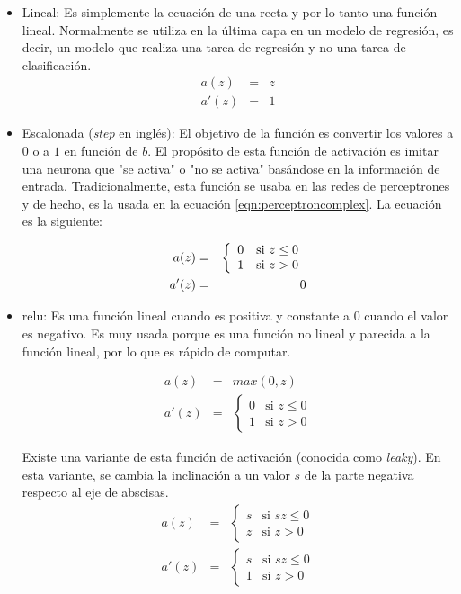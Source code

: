 \begin{itemize}
\item Lineal: Es simplemente la ecuación de una recta y por lo tanto una función lineal. Normalmente se utiliza en la última capa en un modelo de regresión, es decir, un modelo que realiza una tarea de regresión y no una tarea de clasificación.
\begin{eqnarray}
  a(z) & = & z \\
  a'(z) & = & 1 
\end{eqnarray}

\item Escalonada (\textit{step} en inglés): El objetivo de la función es convertir los valores a $0$ o a $1$ en función de $b$. El propósito de esta función de activación es imitar una neurona que "se activa" o "no se activa" basándose en la información de entrada. Tradicionalmente, esta función se usaba en las redes de perceptrones y de hecho, es la usada en la ecuación \ref{eqn:perceptroncomplex}. La ecuación es la siguiente:

\begin{eqnarray}
  a(z) & = & \left\{ \begin{array}{ll}
      0 & \mbox{si } z \leq 0 \\
      1 & \mbox{si } z > 0
      \end{array} \right. \\
     \newline
  a'(z) & = & 0 
\end{eqnarray}


\item \acrfull{relu}: Es una función lineal cuando es positiva y constante a 0 cuando el valor es negativo. Es muy usada porque es una función no lineal y parecida a la función lineal, por lo que es rápido de computar.

\begin{eqnarray}
    a(z) & = & max(0,z) \\
  a'(z) & = & \left\{ \begin{array}{ll}
      0 & \mbox{si } z \leq 0   \\
      1 & \mbox{si } z > 0 
      \end{array} \right.
\end{eqnarray}

Existe una variante de esta función de activación (conocida como \textit{leaky}). En esta variante, se cambia la inclinación a un valor $s$ de la parte negativa respecto al eje de abscisas. 
\begin{eqnarray}
    a(z) & = & \left\{ \begin{array}{ll}
      s & \mbox{si } sz \leq 0   \\
      z & \mbox{si } z > 0 
      \end{array} \right. \\
  a'(z) & = & \left\{ \begin{array}{ll}
      s & \mbox{si } sz \leq 0   \\
      1 & \mbox{si } z > 0 
      \end{array} \right.
\end{eqnarray}


\end{itemize}
